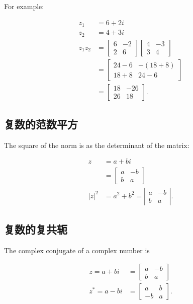 For example:

$$
\begin{aligned}
z_{1} & =6+2 i \\
z_{2} & =4+3 i \\
z_{1} z_{2} & =\left[\begin{array}{cc}
6 & -2 \\
2 & 6
\end{array}\right]\left[\begin{array}{cc}
4 & -3 \\
3 & 4
\end{array}\right] \\
& =\left[\begin{array}{cc}
24-6 & -(18+8) \\
18+8 & 24-6
\end{array}\right] \\
& =\left[\begin{array}{cc}
18 & -26 \\
26 & 18
\end{array}\right] .
\end{aligned}
$$

\subsection{复数的范数平方}
The square of the norm is as the determinant of the matrix:

$$
\begin{aligned}
z & =a+b i \\
& =\left[\begin{array}{cc}
a & -b \\
b & a
\end{array}\right] \\
|z|^{2} & =a^{2}+b^{2}=\left|\begin{array}{cc}
a & -b \\
b & a
\end{array}\right| .
\end{aligned}
$$

\subsection{复数的复共轭}
The complex conjugate of a complex number is

$$
\begin{aligned}
z=a+b i & =\left[\begin{array}{cc}
a & -b \\
b & a
\end{array}\right] \\
z^{*}=a-b i & =\left[\begin{array}{cc}
a & b \\
-b & a
\end{array}\right] .
\end{aligned}
$$

